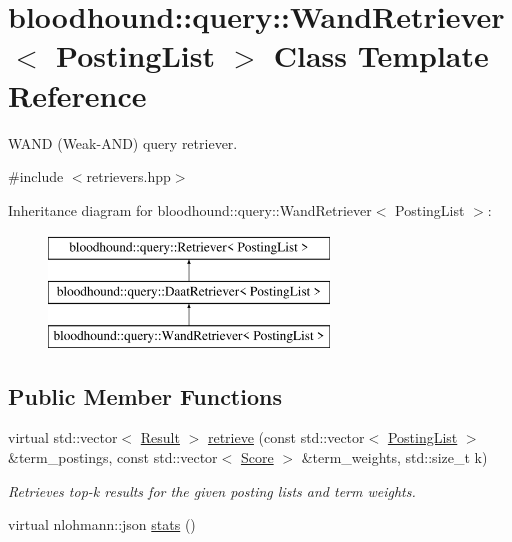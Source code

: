\hypertarget{classbloodhound_1_1query_1_1WandRetriever}{}\section{bloodhound\+:\+:query\+:\+:Wand\+Retriever$<$ Posting\+List $>$ Class Template Reference}
\label{classbloodhound_1_1query_1_1WandRetriever}


W\+A\+ND (Weak-\/\+A\+ND) query retriever.  




{\ttfamily \#include $<$retrievers.\+hpp$>$}

Inheritance diagram for bloodhound\+:\+:query\+:\+:Wand\+Retriever$<$ Posting\+List $>$\+:\begin{figure}[H]
\begin{center}
\leavevmode
\includegraphics[height=3.000000cm]{classbloodhound_1_1query_1_1WandRetriever}
\end{center}
\end{figure}
\subsection*{Public Member Functions}
\begin{DoxyCompactItemize}
\item 
virtual std\+::vector$<$ \mbox{\hyperlink{structbloodhound_1_1query_1_1Result}{Result}} $>$ \mbox{\hyperlink{classbloodhound_1_1query_1_1WandRetriever_a5f3068bc363c16c5b7255a925ea5af8c}{retrieve}} (const std\+::vector$<$ \mbox{\hyperlink{classbloodhound_1_1PostingList}{Posting\+List}} $>$ \&term\+\_\+postings, const std\+::vector$<$ \mbox{\hyperlink{structbloodhound_1_1Score}{Score}} $>$ \&term\+\_\+weights, std\+::size\+\_\+t k)
\begin{DoxyCompactList}\small\item\em Retrieves top-\/k results for the given posting lists and term weights. \end{DoxyCompactList}\item 
virtual nlohmann\+::json \mbox{\hyperlink{classbloodhound_1_1query_1_1WandRetriever_a1e593c2cddb2ca4f2415c59ca26e6a36}{stats}} ()
\end{DoxyCompactItemize}


